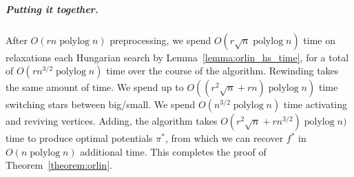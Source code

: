 \documentclass[a4paper,UKenglish]{socg-lipics-v2018}
\def\etal{\emph{et~al.}}
\def\etal{\textit{et~al.}}
\def\polylog{\mathop{\mathrm{polylog}}}
\theoremstyle{plain}
\numberwithin{figure}{section}
\renewcommand{\paragraph}{\subparagraph}
\begin{document}
\paragraph{Putting it together.}
After $O(rn\polylog n)$ preprocessing, we spend $O(r\sqrt{n}\polylog n)$ time
on relaxations each Hungarian search by Lemma~\ref{lemma:orlin_hs_time},
for a total of $O(rn^{3/2}\polylog n)$ time over the course of the algorithm.
Rewinding takes the same amount of time.
We spend up to $O((r^2\sqrt{n} + rn)\polylog n)$ time switching stars between big/small.
We spend $O(n^{3/2}\polylog n)$ time activating and reviving vertices.
Adding, the algorithm takes $O(r^2\sqrt{n} + rn^{3/2})\polylog n)$ time to
produce optimal potentials $\pi^*$, from which we can recover $f^*$ in
$O(n\polylog n)$ additional time.
This completes the proof of Theorem~\ref{theorem:orlin}.






\newpage
\appendix
\end{document}

